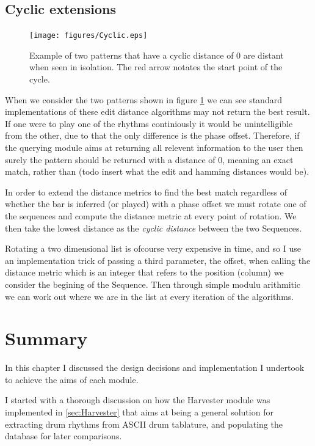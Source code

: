 \documentclass[12pt,twoside,notitlepage]{report}
\begin{document}
		
		\subsection{Cyclic extensions}
		\begin{figure}[h]
			\centerline{\texttt{[image: figures/Cyclic.eps]}}
			\caption{\label{fig:cyclic example} Example of two patterns that have a cyclic distance of 0 are distant when seen in isolation. The red arrow notates the start point of the cycle.}
\end{figure}	
		When we consider the two patterns shown in figure \ref{fig:cyclic example} we can see standard implementations of these edit distance algorithms may not return the best result. If one were to play one of the rhythms continiously it would be unintelligible from the other, due to that the only difference is the phase offset. Therefore, if the querying module aims at returning all relevent information to the user then surely the pattern should be returned with a distance of 0, meaning an exact match, rather than (todo insert what the edit and hamming distances would be).
		
		In order to extend the distance metrics to find the best match regardless of whether the bar is inferred (or played) with a phase offset we must rotate one of the sequences and compute the distance metric at every point of rotation. We then take the lowest distance as the \emph{cyclic distance} between the two Sequences.
		
		Rotating a two dimensional list is ofcourse very expensive in time, and so I use an implementation trick of passing a third parameter, the offset, when calling the distance metric which is an integer that refers to the position (column) we consider the begining of the Sequence. Then through simple modulu arithmitic we can work out where we are in the list at every iteration of the algorithms.
		
	\section{Summary}
	In this chapter I discussed the design decisions and implementation I undertook to achieve the aims of each module. 
	
	I started with a thorough discussion on how the Harvester module was implemented in \ref{sec:Harvester} that aims at being a general solution for extracting drum rhythms from ASCII drum tablature, and populating the database for later comparisons.
	
\end{document}
